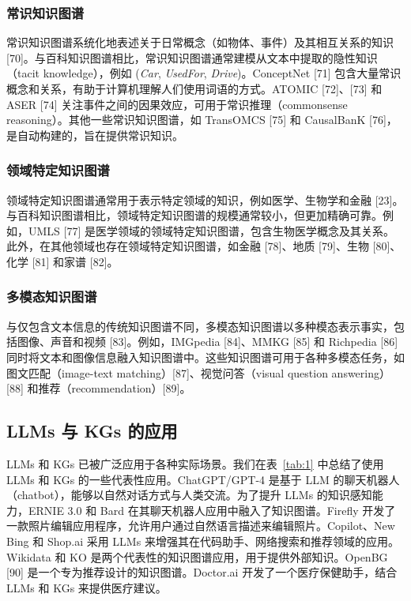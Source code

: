 \documentclass[11pt,UTF8,fontset=fandol]{ctexart}
\begin{document}
\subsubsection{常识知识图谱}

常识知识图谱系统化地表述关于日常概念（如物体、事件）及其相互关系的知识 [70]。与百科知识图谱相比，常识知识图谱通常建模从文本中提取的隐性知识（tacit knowledge），例如 (\textit{Car}, \textit{UsedFor}, \textit{Drive})。ConceptNet [71] 包含大量常识概念和关系，有助于计算机理解人们使用词语的方式。ATOMIC [72]、[73] 和 ASER [74] 关注事件之间的因果效应，可用于常识推理（commonsense reasoning）。其他一些常识知识图谱，如 TransOMCS [75] 和 CausalBanK [76]，是自动构建的，旨在提供常识知识。

\subsubsection{领域特定知识图谱}

领域特定知识图谱通常用于表示特定领域的知识，例如医学、生物学和金融 [23]。与百科知识图谱相比，领域特定知识图谱的规模通常较小，但更加精确可靠。例如，UMLS [77] 是医学领域的领域特定知识图谱，包含生物医学概念及其关系。此外，在其他领域也存在领域特定知识图谱，如金融 [78]、地质 [79]、生物 [80]、化学 [81] 和家谱 [82]。

\subsubsection{多模态知识图谱}

与仅包含文本信息的传统知识图谱不同，多模态知识图谱以多种模态表示事实，包括图像、声音和视频 [83]。例如，IMGpedia [84]、MMKG [85] 和 Richpedia [86] 同时将文本和图像信息融入知识图谱中。这些知识图谱可用于各种多模态任务，如图文匹配（image-text matching）[87]、视觉问答（visual question answering）[88] 和推荐（recommendation）[89]。

\subsection{LLMs 与 KGs 的应用}

LLMs 和 KGs 已被广泛应用于各种实际场景。我们在表~\ref{tab:1} 中总结了使用 LLMs 和 KGs 的一些代表性应用。ChatGPT/GPT-4 是基于 LLM 的聊天机器人（chatbot），能够以自然对话方式与人类交流。为了提升 LLMs 的知识感知能力，ERNIE 3.0 和 Bard 在其聊天机器人应用中融入了知识图谱。Firefly 开发了一款照片编辑应用程序，允许用户通过自然语言描述来编辑照片。Copilot、New Bing 和 Shop.ai 采用 LLMs 来增强其在代码助手、网络搜索和推荐领域的应用。Wikidata 和 KO 是两个代表性的知识图谱应用，用于提供外部知识。OpenBG [90] 是一个专为推荐设计的知识图谱。Doctor.ai 开发了一个医疗保健助手，结合 LLMs 和 KGs 来提供医疗建议。
\end{document}
